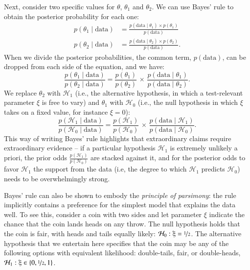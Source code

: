 \documentclass[man]{apa7}
\begin{document}
Next, consider two specific values for $\theta$, $\theta_1$ and $\theta_2$. We can use Bayes' rule to obtain the posterior probability for each one:
\begin{align}
p(\theta_1 \mid \text{data})& =  \frac{p(\text{data} \mid \theta_1) \times p(\theta_1)}{p(\text{data})}\\
p(\theta_2 \mid \text{data})& =  \frac{p(\text{data} \mid \theta_2) \times p(\theta_2)}{p(\text{data})}.
\end{align}
When we divide the posterior probabilities, the common term, $p(\text{data})$, can be dropped from each side of the equation, and we have:
\begin{equation}
    \frac{p(\theta_1 \mid \text{data})}{p(\theta_2 \mid \text{data})} = \frac{p(\theta_1)}{p(\theta_2)} \, \times \, \frac{p(\text{data} \mid \theta_1)}{p(\text{data} \mid \theta_2)}.
\end{equation}
We replace $\theta_2$ with $\mathcal{H}_1$ (i.e., the alternative hypothesis, in which a test-relevant parameter $\xi$ is free to vary) and $\theta_1$ with $\mathcal{H}_0$ (i.e., the null hypothesis in which $\xi$ takes on a fixed value, for instance $\xi=0$):
\begin{equation}
    \frac{p(\mathcal{H}_1 \mid \text{data})}{p(\mathcal{H}_0 \mid \text{data})} = \frac{p(\mathcal{H}_1)}{p(\mathcal{H}_0)} \, \times \, \frac{p(\text{data} \mid \mathcal{H}_1)}{p(\text{data} \mid \mathcal{H}_0)}.
\end{equation}
This way of writing Bayes' rule highlights that extraordinary claims require extraordinary evidence -- if a particular hypothesis $\mathcal{H}_1$ is extremely unlikely a priori, the prior odds $\frac{p(\mathcal{H}_1)}{p(\mathcal{H}_0)}$ are stacked against it, and for the posterior odds to favor $\mathcal{H}_1$ the support from the data (i.e, the degree to which $\mathcal{H}_1$ predicts $\mathcal{H}_0$) needs to be overwhelmingly strong.   

Bayes' rule can also be shown to embody the \emph{principle of parsimony}: the rule implicitly contains a preference for the simplest model that explains the data well. To see this, consider a coin with two sides and let parameter $\xi$ indicate the chance that the coin lands heads on any throw. The null hypothesis holds that the coin is fair, with heads and tails equally likely: $\mathcal{H}_0: \xi = \nicefrac{1}{2}$. The alternative hypothesis that we entertain here specifies that the coin may be any of the following options with equivalent likelihood: double-tails, fair, or double-heads, $\mathcal{H}_1: \xi \in \{0, \nicefrac{1}{2}, 1\}$.
\end{document}
